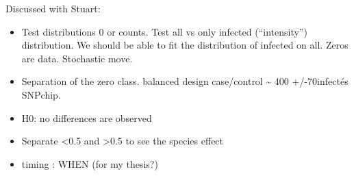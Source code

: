 \documentclass[]{article}
\providecommand{\tightlist}{%
  \setlength{\itemsep}{0pt}\setlength{\parskip}{0pt}}
\begin{document}
Discussed with Stuart:

\begin{itemize}
\tightlist
\item
  Test distributions 0 or counts. Test all vs only infected
  (``intensity'') distribution. We should be able to fit the
  distribution of infected on all. Zeros are data. Stochastic move.
\item
  Separation of the zero class. balanced design case/control
  \textasciitilde{} 400 +/-70infectés SNPchip.
\item
  H0: no differences are observed
\item
  Separate \textless{}0.5 and \textgreater{}0.5 to see the species
  effect
\item
  timing : WHEN (for my thesis?)
\end{itemize}
\end{document}
